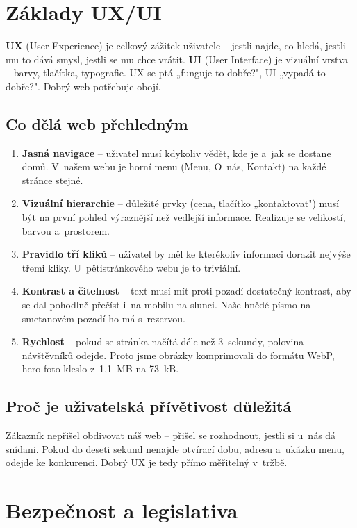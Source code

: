 \documentclass[12pt,a4paper]{article}
\begin{document}
\section{Základy UX/UI}

\textbf{UX} (User Experience) je celkový zážitek uživatele -- jestli najde, co hledá, jestli mu to dává smysl, jestli se mu chce vrátit. \textbf{UI} (User Interface) je vizuální vrstva -- barvy, tlačítka, typografie. UX se ptá „funguje to dobře?", UI „vypadá to dobře?". Dobrý web potřebuje obojí.

\subsection{Co dělá web přehledným}

\begin{enumerate}[label=\arabic*.]
  \item \textbf{Jasná navigace} -- uživatel musí kdykoliv vědět, kde je a~jak se dostane domů. V~našem webu je horní menu (Menu, O~nás, Kontakt) na každé stránce stejné.
  \item \textbf{Vizuální hierarchie} -- důležité prvky (cena, tlačítko „kontaktovat") musí být na první pohled výraznější než vedlejší informace. Realizuje se velikostí, barvou a~prostorem.
  \item \textbf{Pravidlo tří kliků} -- uživatel by měl ke kterékoliv informaci dorazit nejvýše třemi kliky. U~pětistránkového webu je to triviální.
  \item \textbf{Kontrast a čitelnost} -- text musí mít proti pozadí dostatečný kontrast, aby se dal pohodlně přečíst i~na mobilu na slunci. Naše hnědé písmo na smetanovém pozadí ho má s~rezervou.
  \item \textbf{Rychlost} -- pokud se stránka načítá déle než 3~sekundy, polovina návštěvníků odejde. Proto jsme obrázky komprimovali do formátu WebP, hero foto kleslo z~1{,}1~MB na 73~kB.
\end{enumerate}

\subsection{Proč je uživatelská přívětivost důležitá}

Zákazník nepřišel obdivovat náš web -- přišel se rozhodnout, jestli si u~nás dá snídani. Pokud do deseti sekund nenajde otvírací dobu, adresu a~ukázku menu, odejde ke konkurenci. Dobrý UX je tedy přímo měřitelný v~tržbě.

\section{Bezpečnost a legislativa}
\end{document}
